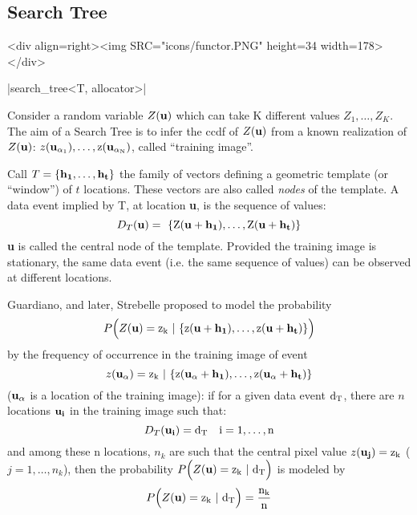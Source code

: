 \documentclass[12pt,twoside]{report}
\newcommand{\loc}[1]{{\bf #1}}
\newcommand{\mloc}[1]{\rm{\bf #1}}
\begin{document}
\subsection{Search Tree}
\begin{htmlonly}
<div align=right><img SRC="icons/functor.PNG" height=34 width=178></div>
\end{htmlonly}

|search_tree<T, allocator>|
\vspace{0.3cm}


\UndefineShortVerb{\|}
Consider a random variable $Z(\mloc{u})$ which can take K different values $Z_1,\ldots,Z_K$. The aim of a Search Tree is to infer the ccdf of $Z(\mloc{u})$ from a known realization of $Z(\mloc{u})$: $z(\mloc{u}_{\alpha_1}),\ldots,z(\mloc{u}_{\alpha_N})$, called ``training image''. 

Call $T= \{ \mloc{h_1}, \ldots, \mloc{h_t} \}$ the family of vectors defining a geometric template (or ``window'') of $t$ locations. These vectors are also called \emph{nodes} of the template. A data event implied by T, at location \loc{u}, is the sequence of values: 
\begin{displaymath}
  D_T(\mloc{u}) = \ \{ Z(\mloc{u}+\mloc{h_1}),\ldots, Z(\mloc{u}+\mloc{h_t}) \}
\end{displaymath}
\loc{u} is called the central node of the template. Provided the training image is stationary, the same data event (i.e. the same sequence of values) can be observed at different locations. 


Guardiano, and later, Strebelle proposed to model the probability 
\begin{displaymath}
  P \Big( Z(\mloc{u}) = z_k \ | \ \{ z(\mloc{u}+\mloc{h_1}), \ldots, z(\mloc{u}+\mloc{h_t}) \} \Big)
\end{displaymath}
by the frequency of occurrence in the training image of event 
\begin{displaymath}
  z(\mloc{u}_{\alpha}) = z_k \ | \ \{ z(\mloc{u}_{\alpha}+\mloc{h_1}), \ldots, z(\mloc{u}_{\alpha}+\mloc{h_t}) \}
\end{displaymath}
 ($\mloc{u_{\alpha}}$ is a location of the training image):
if for a given data event $\rm{d_T}$, there are $n$ locations $\mloc{u_i}$ in the training image such that: 
\begin{displaymath}
  D_T(\mloc{u_i}) = d_T \quad i=1,\ldots,n
\end{displaymath}
and among these n locations, $n_k$ are such that the central pixel value \mbox{$z(\mloc{u_j})=z_k$} ($j=1,\ldots,n_k$), then
 the probability $P \Big(Z(\mloc{u}) = z_k \ | \ d_T \Big)$ is modeled by
\begin{displaymath}
   P \Big(Z(\mloc{u}) = z_k \ | \ d_T \Big)  =  \frac{n_k}{n}
\end{displaymath}
\vspace{0.3cm}
\end{document}
